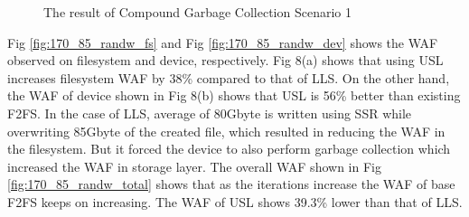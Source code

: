 \documentclass[letterpaper,twocolumn,10pt]{article}
\begin{document}
\begin{figure}[t]
\label{fig:170_85_randw}
\centering

\caption{The result of Compound Garbage Collection Scenario 1\label{fig:170_85_randw} }
\end{figure}

Fig \ref{fig:170_85_randw_fs} and Fig \ref{fig:170_85_randw_dev} shows the WAF observed on filesystem and device, respectively. Fig 8(a) shows that using USL increases filesystem WAF by 38\% compared to that of LLS. On the other hand, the WAF of device shown in Fig 8(b) shows that USL is 56\% better than existing F2FS. In the case of LLS, average of 80Gbyte is written using SSR while overwriting 85Gbyte of the created file, which resulted in reducing the WAF in the filesystem. But it forced the device to also perform garbage collection which increased the WAF in storage layer. The overall WAF shown in Fig \ref{fig:170_85_randw_total} shows that as the iterations increase the WAF of base F2FS keeps on increasing. The WAF of USL shows 39.3\% lower than that of LLS.
\end{document}
